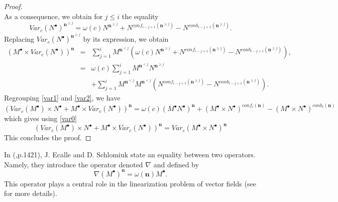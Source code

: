 \documentclass[english,11pt]{amsart}
\def\nn{\mathbf{n}}
\def\di{\displaystyle}
\def\nn{\mathbf{n}}
\begin{document}
\begin{proof}
\begin{equation}
\end{equation}
As a consequence, we obtain for $j\leq i$ the equality
\begin{equation}
    Var_c (N^{\bullet} ) ^{\nn^{\geq j }} = \omega (c) N^{\nn^{\geq j}} + N^{conf_{i-j+1} (\nn^{\geq j} )} -N^{conb_{i-j+1} (\nn^{\geq j} )} . 
\end{equation}
Replacing $Var_c (N^{\bullet})^{\nn^{\geq j}}$ by its expression, we obtain
\begin{equation}
\label{var2}
\left .
\begin{array}{lll}
\left (     M^{\bullet}\times Var_c (N^{\bullet} ) \right ) ^{\nn} & = &  \di\sum_{j=1}^{i} M^{\nn^{<j}} \left ( \omega (c) N^{\nn^{\geq j}} + N^{conf_{i-j+1} (\nn^{\geq j} )} -N^{conb_{i-j+1} (\nn^{\geq j} )} \right ) ,\\
 & = & \omega (c) \di\sum_{j=1}^{i} M^{\nn^{<j}} N^{\nn^{\geq j}}\\
 &    & 
 +\di\sum_{j=1}^{i} M^{\nn^{<j}} M^{\nn^{<j}} \left ( N^{conf_{i-j+1} (\nn^{\geq j} )} -N^{conb_{i-j+1} (\nn^{\geq j} )} \right ) .
\end{array}
\right .
\end{equation}
Regrouping \eqref{var1} and \eqref{var2}, we have 
\begin{equation}
    \left (  Var_c (M^{\bullet})\times N^{\bullet} + 
    M^{\bullet}\times Var_c (N^{\bullet} ) \right ) ^{\nn} =
    \omega (c) \left ( M^{\bullet} N^{\bullet} \right )^{\nn} + (M^{\bullet} \times N^{\bullet} )^{conf_i (\nn )} - 
    (M^{\bullet} \times N^{\bullet} )^{conb_i (\nn )}
\end{equation}
which gives using \eqref{var0}
\begin{equation}
\left (  Var_c (M^{\bullet})\times N^{\bullet} + 
    M^{\bullet}\times Var_c (N^{\bullet} ) \right ) ^{\nn} =   Var_c (M^{\bullet} \times N^{\bullet})^{\nn} 
\end{equation}
This concludes the proof.
\end{proof}

In (\cite{es},p.1421), J. Ecalle and D. Schlomiuk state an equality between two operators. Namely, they introduce the operator denoted $\nabla$ and defined by
\begin{equation}
    \nabla (M^{\bullet} )^{\nn} = \omega (\nn ) M^{\bullet} . 
\end{equation}
This operator plays a central role in the linearization problem of vector fields (see \cite{ec1,cr2} for more details). \\
\end{document}
